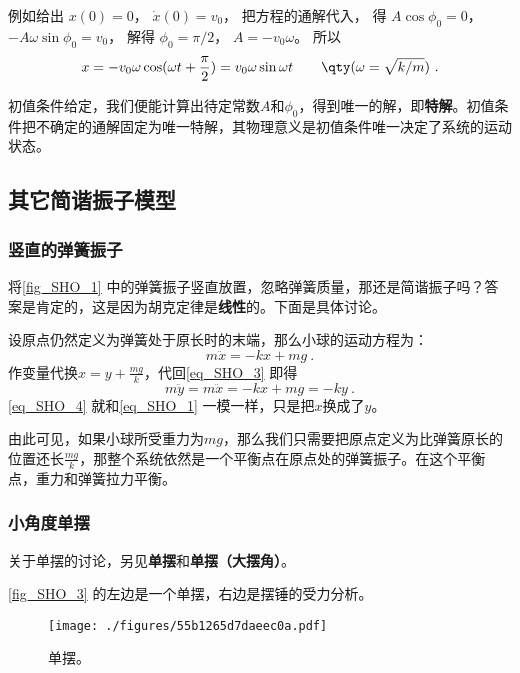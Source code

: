 例如给出 $x(0) = 0$，  $\dot x(0) = v_0$， 把方程的通解代入， 得 $A\cos \phi_0 = 0$，  $ - A\omega \sin \phi_0 = v_0$， 解得 $\phi_0 = \pi /2$，  $A =  -v_0\omega $。 所以
\begin{equation}
x =  - v_0\omega \cos (\omega t + \frac{\pi }{2}) = v_0\omega \sin \omega t \qquad \qty(\omega  = \sqrt{k/m})~.
\end{equation}

初值条件给定，我们便能计算出待定常数$A$和$\phi_0$，得到唯一的解，即\textbf{特解}。初值条件把不确定的通解固定为唯一特解，其物理意义是初值条件唯一决定了系统的运动状态。


\subsection{其它简谐振子模型}

\subsubsection{竖直的弹簧振子}

将\autoref{fig_SHO_1} 中的弹簧振子竖直放置，忽略弹簧质量，那还是简谐振子吗？答案是肯定的，这是因为胡克定律是\textbf{线性}的。下面是具体讨论。

设原点仍然定义为弹簧处于原长时的末端，那么小球的运动方程为：
\begin{equation}\label{eq_SHO_3}
m\ddot{x} = -kx+mg~.
\end{equation}
作变量代换$x=y+\frac{mg}{k}$，代回\autoref{eq_SHO_3} 即得
\begin{equation}\label{eq_SHO_4}
m\ddot{y} = m\ddot{x} = -kx+mg = -ky~.
\end{equation}
\autoref{eq_SHO_4} 就和\autoref{eq_SHO_1} 一模一样，只是把$x$换成了$y$。

由此可见，如果小球所受重力为$mg$，那么我们只需要把原点定义为比弹簧原长的位置还长$\frac{mg}{k}$，那整个系统依然是一个平衡点在原点处的弹簧振子。在这个平衡点，重力和弹簧拉力平衡。


\subsubsection{小角度单摆}

关于单摆的讨论，另见\textbf{单摆}和\textbf{单摆（大摆角）}。

\autoref{fig_SHO_3} 的左边是一个单摆，右边是摆锤的受力分析。

\begin{figure}[ht]
\centering
\texttt{[image: ./figures/55b1265d7daeec0a.pdf]}
\caption{单摆。} \label{fig_SHO_3}
\end{figure}

